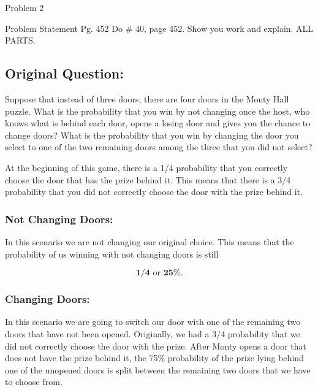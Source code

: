 \begin{problem}{Problem 2}
    \begin{statement}{Problem Statement}
        Pg. 452 Do \# 40, page 452. Show you work and explain. ALL PARTS.

        \subsection*{Original Question:}

        Suppose that instead of three doors, there are four doors in the Monty Hall puzzle. What is the probability that you win by not changing once the host, who knows what is behind each door, opens 
        a losing door and gives you the chance to change doors? What is the probability that you win by changing the door you select to one of the two remaining doors among the three that you did not select?
    \end{statement}

    \begin{Highlight}[Solution]
        At the beginning of this game, there is a 1/4 probability that you correctly choose the door that has the prize behind it. This means that there is a 3/4 probability that you did not correctly choose
        the door with the prize behind it.

        \subsubsection*{Not Changing Doors:}

        In this scenario we are not changing our original choice. This means that the probability of us winning with not changing doors is still 
        
        \setcounter{equation}{0}
        \begin{equation}
            \mathbf{1/4} \text{ or } \mathbf{25\%}.
        \end{equation}

        \subsubsection*{Changing Doors:}

        In this scenario we are going to switch our door with one of the remaining two doors that have not been opened. Originally, we had a 3/4 probability that we did not correctly choose the door 
        with the prize. After Monty opens a door that does not have the prize behind it, the 75\% probability of the prize lying behind one of the unopened doors is split between the remaining two
        doors that we have to choose from.


\end{Highlight}
\end{problem}
